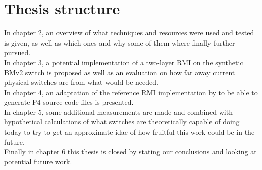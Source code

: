 \section{Thesis structure}
In chapter 2, an overview of what techniques and resources were used and tested is given, as well as which ones and why some of them where finally further pursued.\\

\noindent
In chapter 3, a potential implementation of a two-layer RMI on the synthetic BMv2 switch is proposed as well as an evaluation on how far away current physical switches are from what would be needed.\\

\noindent
In chapter 4, an adaptation of the reference RMI implementation by \cite{cdfshop} to be able to generate P4 source code files is presented.\\

\noindent
In chapter 5, some additional measurements are made and combined with hypothetical calculations of what switches are theoretically capable of doing today to try to get an approximate idae of how fruitful this work could be in the future.\\

\noindent
Finally in chapter 6 this thesis is closed by stating our conclusions and looking at potential future work.



